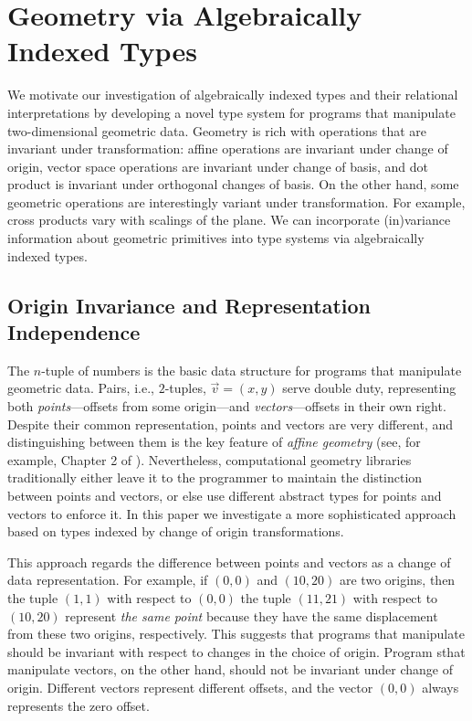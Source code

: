 \section{Geometry via Algebraically Indexed Types}
\label{sec:motivating-examples}

We motivate our investigation of algebraically indexed types and their
relational interpretations by developing a novel type system for
programs that manipulate two-dimensional geometric data. Geometry is
rich with operations that are invariant under transformation: affine
operations are invariant under change of origin, vector space
operations are invariant under change of basis, and dot product is
invariant under orthogonal changes of basis. On the other hand, some
geometric operations are interestingly variant under transformation.
For example, cross products vary with scalings of the plane. We
can incorporate (in)variance information about geometric primitives
into type systems via algebraically indexed types.

\subsection{Origin Invariance and Representation Independence}\label{sec:oiri}

The $n$-tuple of numbers is the basic data structure for programs that
manipulate geometric data. Pairs, i.e., $2$-tuples, 
$\vec{v} = (x,y)$ serve double duty, representing
both \emph{points}---offsets from some origin---and
\emph{vectors}---offsets in their own right.  Despite their common
representation, points and vectors are very different, and
distinguishing between them is the key feature of \emph{affine
  geometry} (see, for example, Chapter 2 of
\cite{gallier11geometric}). Nevertheless, computational geometry
libraries traditionally either leave it to the programmer to maintain
the distinction between points and vectors, or else use different
abstract types for points and vectors to enforce it.
In this paper we investigate a more sophisticated approach based on 
types indexed by change of origin transformations.

This approach regards the difference between points and vectors as a
change of data representation. For example, if $(0,0)$ and $(10,20)$
are two origins, then the tuple $(1,1)$ with respect to $(0,0)$ the
tuple $(11,21)$ with respect to $(10,20)$ represent \emph{the same
  point} because they have the same displacement from these two
origins, respectively.
This suggests that programs that manipulate %
should be invariant with respect to changes in the choice of
origin. Program sthat manipulate vectors, on the other hand, should
not be invariant under change of origin. Different vectors represent
different offsets, and the vector $(0,0)$ always represents the zero
offset.

